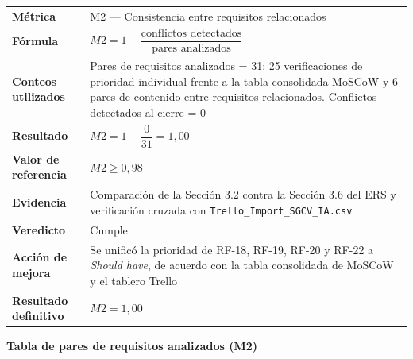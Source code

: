 \begin{tabular}{p{3.2cm}p{9.5cm}}
\hline
\textbf{Métrica} &
M2 — Consistencia entre requisitos relacionados \\

\textbf{Fórmula} &
$M2 =
1-\dfrac{\text{conflictos detectados}}
{\text{pares analizados}}$ \\

\textbf{Conteos utilizados} &
Pares de requisitos analizados = 31:
25 verificaciones de prioridad individual frente a la tabla consolidada
MoSCoW y 6 pares de contenido entre requisitos relacionados. \newline
Conflictos detectados al cierre = 0 \\

\textbf{Resultado} &
$M2=1-\dfrac{0}{31}=1{,}00$ \\

\textbf{Valor de referencia} & $M2\geq0{,}98$ \\

\textbf{Evidencia} &
Comparación de la Sección 3.2 contra la Sección 3.6 del ERS y
verificación cruzada con
\texttt{Trello\_Import\_SGCV\_IA.csv} \\

\textbf{Veredicto} & Cumple \\

\textbf{Acción de mejora} &
Se unificó la prioridad de RF-18, RF-19, RF-20 y RF-22 a
\emph{Should have}, de acuerdo con la tabla consolidada de MoSCoW
y el tablero Trello \\

\textbf{Resultado definitivo} & $M2=1{,}00$ \\

\hline
\end{tabular}

\vspace{0.3cm}

\noindent\textbf{Tabla de pares de requisitos analizados (M2)}

